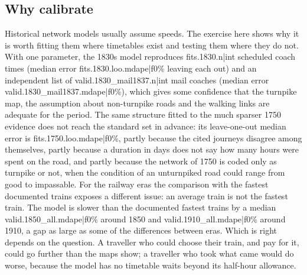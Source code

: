 \subsection{Why calibrate}
Historical network models usually assume speeds. The exercise here shows why it is worth fitting them where timetables exist and testing them where they do not. With one parameter, the 1830s model reproduces {{fits.1830.n|int}} scheduled coach times (median error {{fits.1830.loo.mdape|f0}}\% leaving each out) and an independent list of {{valid.1830_mail1837.n|int}} mail coaches (median error {{valid.1830_mail1837.mdape|f0}}\%), which gives some confidence that the turnpike map, the assumption about non-turnpike roads and the walking links are adequate for the period. The same structure fitted to the much sparser 1750 evidence does not reach the standard set in advance: its leave-one-out median error is {{fits.1750.loo.mdape|f0}}\%, partly because the cited journeys disagree among themselves, partly because a duration in days does not say how many hours were spent on the road, and partly because the network of 1750 is coded only as turnpike or not, when the condition of an unturnpiked road could range from good to impassable. For the railway eras the comparison with the fastest documented trains exposes a different issue: an average train is not the fastest train. The model is slower than the documented fastest trains by a median {{valid.1850_all.mdape|f0}}\% around 1850 and {{valid.1910_all.mdape|f0}}\% around 1910, a gap as large as some of the differences between eras. Which is right depends on the question. A traveller who could choose their train, and pay for it, could go further than the maps show; a traveller who took what came would do worse, because the model has no timetable waits beyond its half-hour allowance.

